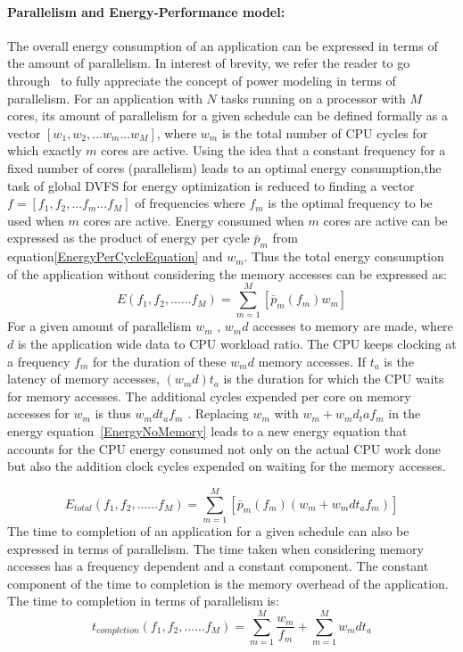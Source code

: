 \documentclass[11pt, letterpaper]{article}
\begin{document}
\paragraph{Parallelism and Energy-Performance model:}
 The overall energy consumption of an application can be expressed in terms of the amount of parallelism. In interest of brevity, we refer the reader to go through~\cite{ConvexAndScheduling} to fully appreciate the concept of power modeling in terms of parallelism. For an application with $N$ tasks running on a processor with $M$ cores, its amount of parallelism for a given schedule can be defined formally  as a vector $[w_1 , w_2, ...w_m ...w_M ]$, where $w_m$ is the total number of CPU cycles for which exactly $m$ cores are active. Using the idea that a constant frequency for a fixed number of cores (parallelism) leads to an optimal energy consumption,the task of global DVFS for energy optimization is reduced to finding a vector $f = [f_1 , f_2 , ...f_m ...f_M ]$ of frequencies where $f_m$ is the optimal frequency to be used when $m$ cores are active. Energy consumed when $m$ cores are active can be expressed as the product of energy per cycle $\bar{p}_m$ from equation\ref{EnergyPerCycleEquation} and $w_m$.
 Thus the total energy consumption of the application without considering the memory accesses can be expressed as:
  \begin{equation}\label{EnergyNoMemory}
  E(f_1, f_2,......f_M) = \sum_{m=1}^{M}[\bar{p}_m(f_m)w_m]
 \end{equation} 
For a given amount of parallelism $w_m$ , $w_md$ accesses to memory are made, where $d$ is the application wide data to CPU workload ratio. The CPU keeps clocking at a frequency $f_m$ for the duration of these $w_md$ memory accesses. If $t_a$ is the latency of memory accesses, $(w_m d)t_a$ is the duration for which the CPU waits for memory accesses. The additional cycles expended per core on memory accesses for $w_m$ is thus $w_mdt_af_m$ . Replacing $w_m$ with $w_m +w_m d_taf_m$ in the energy equation~\ref{EnergyNoMemory} leads to a new energy equation that accounts for the CPU energy consumed not only on the actual CPU work done but also the addition clock cycles expended on waiting for the memory accesses. 

\begin{equation}\label{EnergyWithMemory}
  E_{total}(f_1, f_2,......f_M) = \sum_{m=1}^{M}[\bar{p}_m(f_m)(w_m + w_m dt_af_m)]
 \end{equation} 
  The time to completion of an application for a given schedule can also be expressed in terms of parallelism. The time taken when considering memory accesses has a frequency dependent and a constant component. The constant component of the time to completion is the memory overhead of the application. The time to completion in terms of parallelism is:
  \begin{equation}\label{TimeToCompletion}
  t_{completion}(f_1, f_2,......f_M) = \sum_{m=1}^{M}\frac{w_m}{f_m} +  \sum_{m=1}^{M}w_mdt_a
 \end{equation}
 
\end{document}
